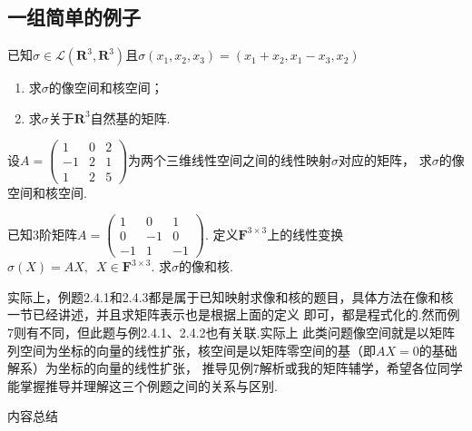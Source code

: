 \subsection{一组简单的例子}
\begin{example}\label{example:5:矩阵表示1}
    已知$\sigma \in \mathcal{L}(\mathbf{R}^3,\mathbf{R}^3)$且$\sigma(x_1,x_2,x_3)=(x_1+x_2,x_1-x_3, x_2)$
    \begin{enumerate}[label=(\arabic*)]
        \item 求$\sigma$的像空间和核空间；

        \item 求$\sigma$关于$\mathbf{R}^3$自然基的矩阵.
    \end{enumerate}
\end{example}

\begin{example}\label{example:5:矩阵表示2}
    设$A=\begin{pmatrix}1 & 0 & 2 \\ -1 & 2 & 1 \\ 1 & 2 & 5\end{pmatrix}$为两个三维线性空间之间的线性映射$\sigma$对应的矩阵，
    求$\sigma$的像空间和核空间.
\end{example}

\begin{example}\label{example:5:矩阵表示3}
    已知3阶矩阵$A=\begin{pmatrix}
        1 & 0 & 1 \\ 0 & -1 & 0 \\ -1 & 1 & -1
    \end{pmatrix}$. 定义$\mathbf{F}^{3 \times 3}$上的线性变换$\sigma(X)=AX,\enspace X \in \mathbf{F}^{3 \times 3}$.
    求$\sigma$的像和核.
\end{example}
实际上，例题2.4.1和2.4.3都是属于已知映射求像和核的题目，具体方法在像和核一节已经讲述，并且求矩阵表示也是根据上面的定义
即可，都是程式化的.然而例7则有不同，但此题与例2.4.1、2.4.2也有关联.实际上
此类问题像空间就是以矩阵列空间为坐标的向量的线性扩张，核空间是以矩阵零空间的基（即$AX=0$的基础解系）为坐标的向量的线性扩张，
推导见例7解析或我的矩阵辅学，希望各位同学能掌握推导并理解这三个例题之间的关系与区别. %

\vspace{2ex}
\centerline{\heiti \Large 内容总结}

\vspace{2ex}

